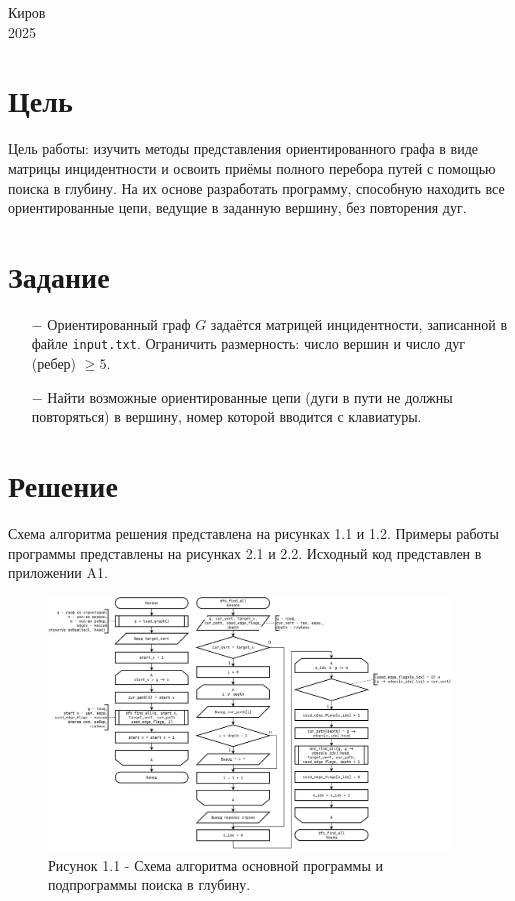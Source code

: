 \documentclass[oneside,a4paper,14pt]{extarticle}
\begin{document}
\begin{center}
	Киров\\
	2025
\end{center}

\newpage\thispagestyle{plain}

\section*{Цель}

Цель работы: изучить методы представления ориентированного графа в виде матрицы инцидентности и освоить приёмы полного перебора путей с помощью поиска в глубину. На их основе разработать программу, способную находить все ориентированные цепи, ведущие в заданную вершину, без повторения дуг.
\section*{Задание}
\begin{itemize}
	\item[$-$] Ориентированный граф \(G\) задаётся матрицей инцидентности, записанной в файле \texttt{input.txt}. Ограничить размерность: число вершин и число дуг (ребер) \(\ge 5\).
	\item[$-$] Найти возможные ориентированные цепи (дуги в пути не должны повторяться) в вершину, номер которой вводится с клавиатуры.
\end{itemize}

\section*{Решение}

Схема алгоритма решения представлена на рисунках 1.1 и 1.2. Примеры работы программы представлены на рисунках 2.1 и 2.2. Исходный код представлен в приложении A1.

\clearpage
\begin{figure}[H]
	\centering
	\includegraphics[width=0.95\textwidth]{pics/flowchart1.png}
	\caption*{Рисунок 1.1 - Схема алгоритма основной программы и подпрограммы поиска в глубину.}
\end{figure}
\end{document}

